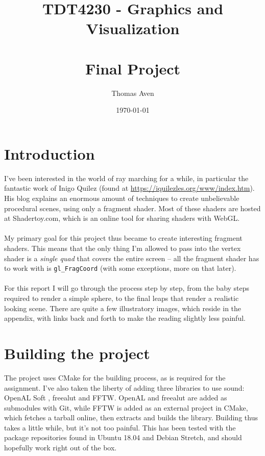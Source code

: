 \documentclass[abstract=off,oneside]{scrreprt}
\author{Thomas Aven}
\date{\today}
\title{TDT4230 - Graphics and Visualization \large \\~\\ Final Project}
\begin{document}
\maketitle

\section*{Introduction}
\label{sec-1}
I've been interested in the world of ray marching for a while, in
particular the fantastic work of Inigo Quilez (found at
\url{https://iquilezles.org/www/index.htm}). His blog explains an enormous
amount of techniques to create unbelievable procedural scenes, using
only a fragment shader. Most of these shaders are hosted at
Shadertoy.com, which is an online tool for sharing shaders with WebGL.
\\\\
My primary goal for this project thus became to create interesting
fragment shaders. This means that the only thing I'm allowed to pass
into the vertex shader is a \emph{single quad} that covers the
entire screen -- all the fragment shader has to work with is
\verb~gl_FragCoord~ (with some exceptions, more on that later).
\\\\
For this report I will go through the process step by step, from the
baby steps required to render a simple sphere, to the final leaps that
render a realistic looking scene. There are quite a few illustratory
images, which reside in the appendix, with links back and forth to
make the reading slightly less painful.

\section*{Building the project}
\label{sec-2}
The project uses CMake for the building process, as is required for
the assignment. I've also taken the liberty of adding three libraries
to use sound: OpenAL Soft , freealut and FFTW. OpenAL and freealut are
added as submodules with Git, while FFTW is added as an external
project in CMake, which fetches a tarball online, then extracts and
builds the library. Building thus takes a little while, but it's not
too painful. This has been tested with the package repositories found
in Ubuntu 18.04 and Debian Stretch, and should hopefully work right
out of the box.
\end{document}
